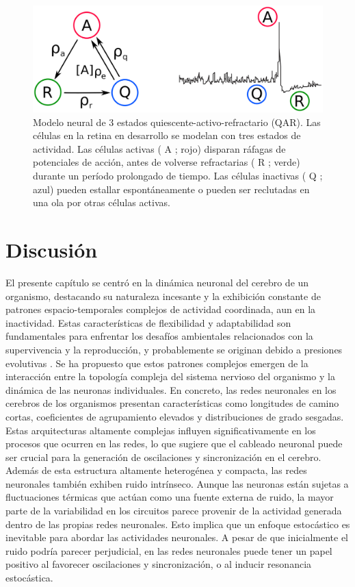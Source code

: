 \begin{figure}[ht]
	\centering\includegraphics[width=\imsize]{estadoneuronas.png}
	\caption[Modelo neural de 3 estados quiescente-activo-refractario (QAR) .]{Modelo neural de 3 estados quiescente-activo-refractario (QAR). Las células en la retina en desarrollo se modelan con tres estados de actividad. Las células activas ( A ; rojo) disparan ráfagas de potenciales de acción, antes de volverse refractarias ( R ; verde) durante un período prolongado de tiempo. Las células inactivas ( Q ; azul) pueden estallar espontáneamente o pueden ser reclutadas en una ola por otras células activas.} 	\label{fig:estadoneuronas}
\end{figure}




\section{Discusión}
	
El presente capítulo se centró en la dinámica neuronal del cerebro de un organismo, destacando su naturaleza incesante y la exhibición constante de patrones espacio-temporales complejos de actividad coordinada, aun en la inactividad. Estas características de flexibilidad y adaptabilidad son fundamentales para enfrentar los desafíos ambientales relacionados con la supervivencia y la reproducción, y probablemente se originan debido a presiones evolutivas \cite{haimovici_dynamical_2016}. Se ha propuesto que estos patrones complejos emergen de la interacción entre la topología compleja del sistema nervioso del organismo y la dinámica de las neuronas individuales. En concreto, las redes neuronales en los cerebros de los organismos presentan características como longitudes de camino cortas, coeficientes de agrupamiento elevados y distribuciones de grado sesgadas. Estas arquitecturas altamente complejas influyen significativamente en los procesos que ocurren en las redes, lo que sugiere que el cableado neuronal puede ser crucial para la generación de oscilaciones y sincronización en el cerebro. Además de esta estructura altamente heterogénea y compacta, las redes neuronales también exhiben ruido intrínseco. Aunque las neuronas están sujetas a fluctuaciones térmicas que actúan como una fuente externa de ruido, la mayor parte de la variabilidad en los circuitos parece provenir de la actividad generada dentro de las propias redes neuronales. Esto implica que un enfoque estocástico es inevitable para abordar las actividades neuronales. A pesar de que inicialmente el ruido podría parecer perjudicial, en las redes neuronales puede tener un papel positivo al favorecer oscilaciones y sincronización, o al inducir resonancia estocástica.


